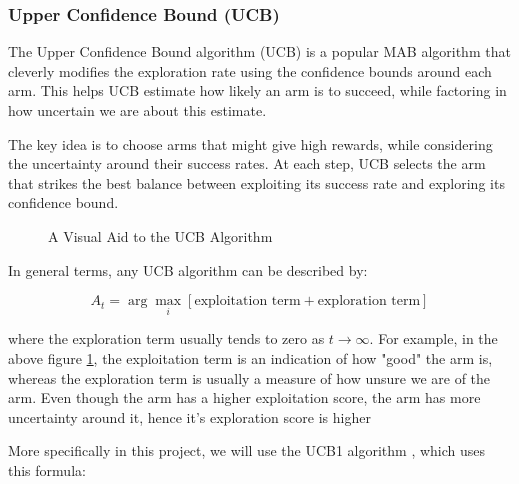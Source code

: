 \subsubsection{Upper Confidence Bound (UCB)}
\label{sec:UCB}


The Upper Confidence Bound algorithm (UCB) is a popular MAB algorithm that cleverly modifies the exploration rate using the confidence bounds around each arm. This helps UCB estimate how likely an arm is to succeed, while factoring in how uncertain we are about this estimate.

The key idea is to choose arms that might give high rewards, while considering the uncertainty around their success rates. At each step, UCB selects the arm that strikes the best balance between exploiting its success rate and exploring its confidence bound.

\begin{figure}[ht]
    \centering
    \caption{A Visual Aid to the UCB Algorithm}
    \label{fig:ucb_image}
\end{figure}



In general terms, any UCB algorithm can be described by:

$$
A_t = \arg\max_i \left[ \text{exploitation term} + \text{exploration term} \right]
$$

where the exploration term usually tends to zero as $t \rightarrow \infty$. For example, in the above figure \ref{fig:ucb_image}, the exploitation term is an indication of how "good" the arm is, whereas the exploration term is usually a measure of how unsure we are of the arm. Even though the  arm has a higher exploitation score, the  arm has more uncertainty around it, hence it's exploration score is higher 

More specifically in this project, we will use the UCB1 algorithm \cite{Slivkins_2019}, which uses this formula:

